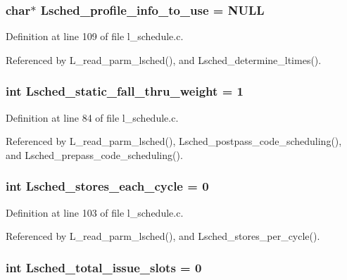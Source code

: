 \subsubsection{\setlength{\rightskip}{0pt plus 5cm}char$\ast$ \bf{Lsched\_\-profile\_\-info\_\-to\_\-use} = \bf{NULL}}\label{l__schedule_8c_11161fe0b364a73fa794db32524bd926}




Definition at line 109 of file l\_\-schedule.c.

Referenced by L\_\-read\_\-parm\_\-lsched(), and Lsched\_\-determine\_\-ltimes().
\subsubsection{\setlength{\rightskip}{0pt plus 5cm}int \bf{Lsched\_\-static\_\-fall\_\-thru\_\-weight} = 1}\label{l__schedule_8c_87ee175780759eb78fb67c94f584eeef}




Definition at line 84 of file l\_\-schedule.c.

Referenced by L\_\-read\_\-parm\_\-lsched(), Lsched\_\-postpass\_\-code\_\-scheduling(), and Lsched\_\-prepass\_\-code\_\-scheduling().
\subsubsection{\setlength{\rightskip}{0pt plus 5cm}int \bf{Lsched\_\-stores\_\-each\_\-cycle} = 0}\label{l__schedule_8c_9be7ba98ab64e7c71052045fd2e066b2}




Definition at line 103 of file l\_\-schedule.c.

Referenced by L\_\-read\_\-parm\_\-lsched(), and Lsched\_\-stores\_\-per\_\-cycle().
\subsubsection{\setlength{\rightskip}{0pt plus 5cm}int \bf{Lsched\_\-total\_\-issue\_\-slots} = 0}\label{l__schedule_8c_7511cf13b18125e863ce2bb076d8f1cd}




